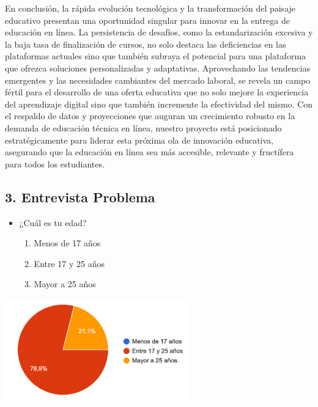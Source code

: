 \documentclass[
]{article}
\providecommand{\tightlist}{%
  \setlength{\itemsep}{0pt}\setlength{\parskip}{0pt}}
\begin{document}
En conclusión, la rápida evolución tecnológica y la transformación del
paisaje educativo presentan una oportunidad singular para innovar en la
entrega de educación en línea. La persistencia de desafíos, como la
estandarización excesiva y la baja tasa de finalización de cursos, no
solo destaca las deficiencias en las plataformas actuales sino que
también subraya el potencial para una plataforma que ofrezca soluciones
personalizadas y adaptativas. Aprovechando las tendencias emergentes y
las necesidades cambiantes del mercado laboral, se revela un campo
fértil para el desarrollo de una oferta educativa que no solo mejore la
experiencia del aprendizaje digital sino que también incremente la
efectividad del mismo. Con el respaldo de datos y proyecciones que
auguran un crecimiento robusto en la demanda de educación técnica en
línea, nuestro proyecto está posicionado estratégicamente para liderar
esta próxima ola de innovación educativa, asegurando que la educación en
línea sea más accesible, relevante y fructífera para todos los
estudiantes.

\newpage

\subsection{3. Entrevista Problema}\label{entrevista-problema}

\begin{itemize}
\tightlist
\item
  ¿Cuál es tu edad?

  \begin{enumerate}
  \def\labelenumi{\alph{enumi}.}
  \tightlist
  \item
    Menos de 17 años
  \item
    Entre 17 y 25 años
  \item
    Mayor a 25 años
  \end{enumerate}
\end{itemize}

\includegraphics[width=0.6\textwidth,height=\textheight]{img/años.png}
\end{document}
